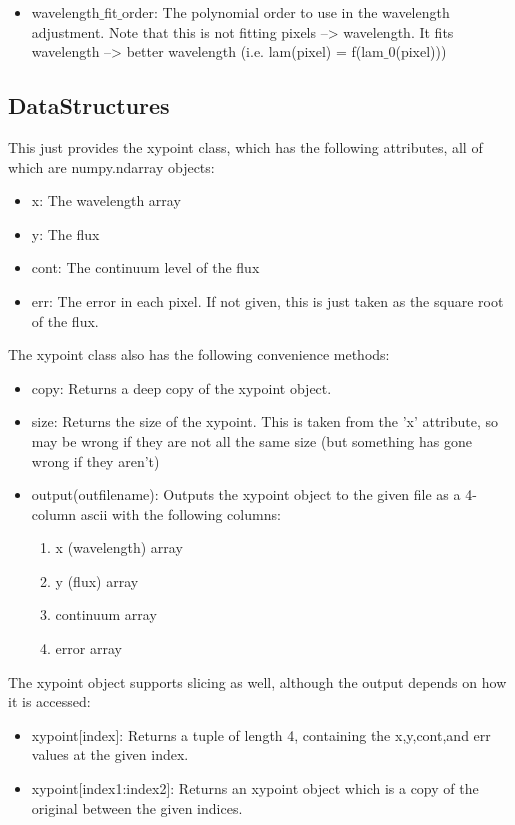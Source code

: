 \documentclass{article}
\begin{document}
\begin{itemize}
\begin{itemize}
      \item wavelength$\_$fit$\_$order: The polynomial order to use in the wavelength adjustment. Note that this is not fitting pixels --> wavelength. It fits wavelength --> better wavelength (i.e. lam(pixel) = f(lam$\_$0(pixel)))
    
    \end{itemize}
    
  
  
    
    
    
    
\subsection{DataStructures}
\label{subsec:datastructures}
This just provides the xypoint class, which has the following attributes, all of which are numpy.ndarray objects:
\begin{itemize}
  \item x: The wavelength array
  \item y: The flux
  \item cont: The continuum level of the flux
  \item err: The error in each pixel. If not given, this is just taken as the square root of the flux.
\end{itemize}

The xypoint class also has the following convenience methods:
\begin{itemize}

  \item copy: Returns a deep copy of the xypoint object.
  \item size: Returns the size of the xypoint. This is taken from the 'x' attribute, so may be wrong if they are not all the same size (but something has gone wrong if they aren't)
  \item output(outfilename): Outputs the xypoint object to the given file as a 4-column ascii with the following columns:
  \begin{enumerate}
    \item x (wavelength) array
    \item y (flux) array
    \item continuum array
    \item error array
  \end{enumerate}
  
  
\end{itemize}
  
The xypoint object supports slicing as well, although the output depends on how it is accessed:
\begin{itemize}

  \item xypoint[index]: Returns a tuple of length 4, containing the x,y,cont,and err values at the given index.
  \item xypoint[index1:index2]: Returns an xypoint object which is a copy of the original between the given indices. 

\end{itemize}




\end{itemize}
\end{document}
